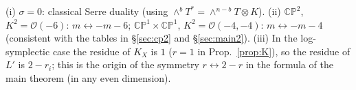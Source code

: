 \begin{rem}
(i) $\sigma=0$: classical Serre duality (using $\wedge^bT^*=\wedge^{n-b}T\otimes K$). (ii) $\mathbb{CP}^2$, $K^2=\mathcal O(-6)$: $m\leftrightarrow-m-6$; $\mathbb{CP}^1\times\mathbb{CP}^1$, $K^2=\mathcal O(-4,-4)$: $m\leftrightarrow-m-4$ (consistent with the tables in \S\ref{sec:cp2} and \S\ref{sec:main2}). (iii) In the log-symplectic case the residue of $K_X$ is $1$ ($r=1$ in Prop.~\ref{prop:K}), so the residue of $L'$ is $2-r_i$; this is the origin of the symmetry $r\leftrightarrow2-r$ in the formula of the main theorem (in any even dimension).
\end{rem}

